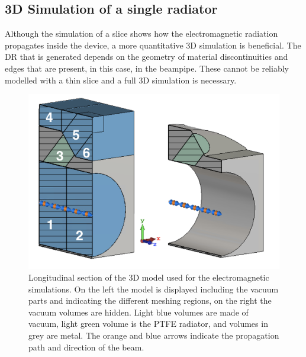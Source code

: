 \subsection[3D Simulation of a single radiator]{3D Simulation of a single radiator}\label{sec:single_electrode}

Although the simulation of a slice shows how the electromagnetic radiation propagates inside the device, a more quantitative 3D simulation is beneficial. The DR that is generated depends on the geometry of material discontinuities and edges that are present, in this case, in the beampipe. These cannot be reliably modelled with a thin slice and a full 3D simulation is necessary.

\begin{figure}[!b]
\centering
\includegraphics[scale=.6, keepaspectratio]{pictures/cut_simulation_both}
\caption{Longitudinal section of the 3D model used for the electromagnetic simulations. On the left the model is displayed including the vacuum parts and indicating the different meshing regions, on the right the vacuum volumes are hidden. Light blue volumes are made of vacuum, light green volume is the PTFE radiator, and volumes in grey are metal. The orange and blue arrows indicate the propagation path and direction of the beam.}
\label{fig:simulation_zones}
\end{figure}

